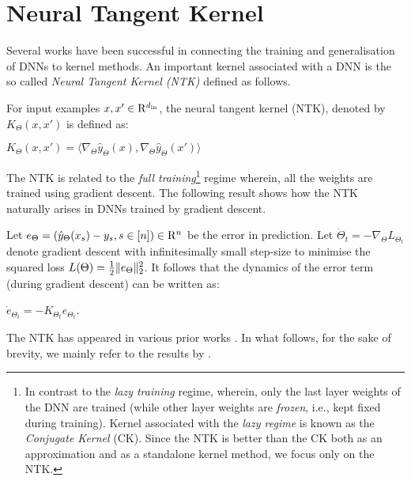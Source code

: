 \section{Neural Tangent Kernel}
Several works \cite{ntk,fcgp,convgp,arora2019exact,arora} have been successful in connecting the training and generalisation of DNNs to kernel methods. An important kernel associated with a DNN is the so called \emph{Neural Tangent Kernel (NTK)} defined as follows.
\begin{definition}\label{def:ntk}
 For input examples $x,x'\in\mathrm{R}^{d_{\text{in}}}$, the neural tangent kernel (NTK), denoted by $K_{\Theta}(x,x')$ is defined as:
\centerline{$
K_{\Theta}(x,x') = \langle\nabla_{\Theta} \hat{y}_{\Theta}(x), \nabla_{\Theta} \hat{y}_{\Theta}(x') \rangle
$}
\end{definition}
The NTK is related to the \emph{full training}\footnote{In contrast to the \emph{lazy training} regime, wherein, only the last layer weights of the DNN are trained (while other layer weights are \emph{frozen}, i.e., kept fixed during training). Kernel associated with the \emph{lazy regime} is known as the \emph{Conjugate Kernel} (CK). Since the NTK  \cite{arora2019exact} is better than the CK \cite{convgp} both as an approximation and as a standalone kernel method, we focus only on the NTK.}  regime wherein, all the weights are trained using gradient descent. The following result shows how the NTK naturally arises in DNNs trained by gradient descent.
\begin{proposition}\label{prop:basic}
Let $e_{\Theta}=\left(\hat{y}_{\Theta}(x_s)-y_s,s\in[n]\right)\in\mathrm{R}^n$ be the error in prediction. Let $\dot{\Theta}_t=-\nabla_{\Theta}L_{\Theta_t}$ denote gradient descent  with infinitesimally small step-size to minimise the  squared loss $L(\Theta)=\frac{1}{2}\|e_{\Theta}\|_2^2$. It follows that the dynamics of the error term (during gradient descent) can be written as:\\ \centerline{$\dot{e}_{\Theta_t}=-K_{\Theta_t} e_{\Theta_t}$.} 
\end{proposition}
The NTK has appeared in various prior works \cite{ntk,dudnn,arora2019exact,cao2019generalization}. In what follows, for the sake of brevity, we mainly refer to the results by \citet{arora2019exact}. 

